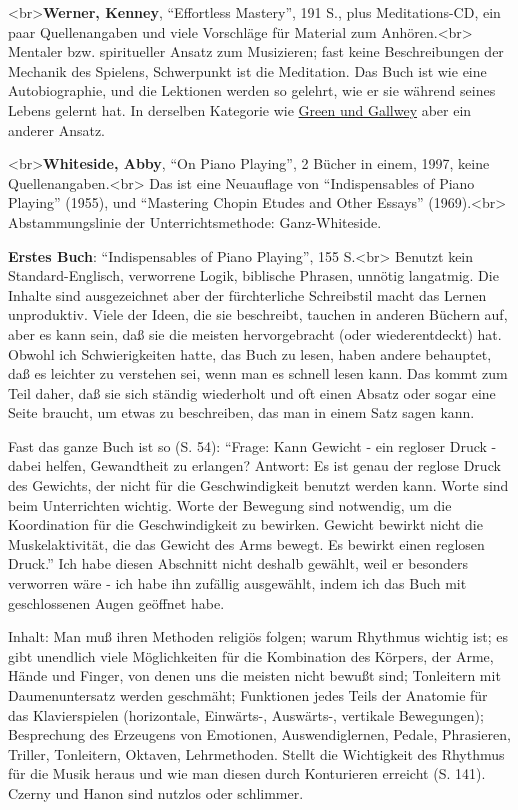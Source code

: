 \hypertarget{Werner}{}

<br>\textbf{Werner, Kenney}, \enquote{Effortless Mastery}, 191 S., plus Meditations-CD, ein paar Quellenangaben und viele Vorschläge für Material zum Anhören.<br>
Mentaler bzw. spiritueller Ansatz zum Musizieren; fast keine Beschreibungen der Mechanik des Spielens, Schwerpunkt ist die Meditation.
Das Buch ist wie eine Autobiographie, und die Lektionen werden so gelehrt, wie er sie während seines Lebens gelernt hat.
In derselben Kategorie wie \hyperlink{Green}{Green und Gallwey} aber ein anderer Ansatz.


\hypertarget{Whiteside}{}

<br>\textbf{Whiteside, Abby}, \enquote{On Piano Playing}, 2 Bücher in einem, 1997, keine Quellenangaben.<br>
Das ist eine Neuauflage von \enquote{Indispensables of Piano Playing} (1955), und \enquote{Mastering Chopin Etudes and Other Essays} (1969).<br>
Abstammungslinie der Unterrichtsmethode: Ganz-Whiteside.

\textbf{Erstes Buch}: \enquote{Indispensables of Piano Playing}, 155 S.<br>
Benutzt kein Standard-Englisch, verworrene Logik, biblische Phrasen, unnötig langatmig.
Die Inhalte sind ausgezeichnet aber der fürchterliche Schreibstil macht das Lernen unproduktiv.
Viele der Ideen, die sie beschreibt, tauchen in anderen Büchern auf, aber es kann sein, daß sie die meisten hervorgebracht (oder wiederentdeckt) hat.
Obwohl ich Schwierigkeiten hatte, das Buch zu lesen, haben andere behauptet, daß es leichter zu verstehen sei, wenn man es schnell lesen kann.
Das kommt zum Teil daher, daß sie sich ständig wiederholt und oft einen Absatz oder sogar eine Seite braucht, um etwas zu beschreiben, das man in einem Satz sagen kann.

Fast das ganze Buch ist so (S. 54): \enquote{Frage: Kann Gewicht - ein regloser Druck - dabei helfen, Gewandtheit zu erlangen?
Antwort: Es ist genau der reglose Druck des Gewichts, der nicht für die Geschwindigkeit benutzt werden kann.
Worte sind beim Unterrichten wichtig.
Worte der Bewegung sind notwendig, um die Koordination für die Geschwindigkeit zu bewirken.
Gewicht bewirkt nicht die Muskelaktivität, die das Gewicht des Arms bewegt.
Es bewirkt einen reglosen Druck.}
Ich habe diesen Abschnitt nicht deshalb gewählt, weil er besonders verworren wäre - ich habe ihn zufällig ausgewählt, indem ich das Buch mit geschlossenen Augen geöffnet habe.

Inhalt: Man muß ihren Methoden religiös folgen; warum Rhythmus wichtig ist; es gibt unendlich viele Möglichkeiten für die Kombination des Körpers, der Arme, Hände und Finger, von denen uns die meisten nicht bewußt sind; Tonleitern mit Daumenuntersatz werden geschmäht; Funktionen jedes Teils der Anatomie für das Klavierspielen (horizontale, Einwärts-, Auswärts-, vertikale Bewegungen); Besprechung des Erzeugens von Emotionen, Auswendiglernen, Pedale, Phrasieren, Triller, Tonleitern, Oktaven, Lehrmethoden.
Stellt die Wichtigkeit des Rhythmus für die Musik heraus und wie man diesen durch Konturieren erreicht (S. 141).
Czerny und Hanon sind nutzlos oder schlimmer.

